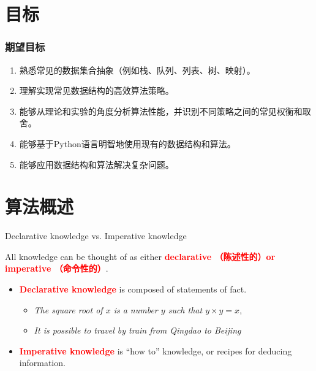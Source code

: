 \documentclass{sintefbeamer}
\begin{document}
\section{目标}

\begin{frame}
  \frametitle{期望目标}

  \begin{enumerate}
    \item 熟悉常见的数据集合抽象（例如栈、队列、列表、树、映射）。
    \item 理解实现常见数据结构的高效算法策略。
    \item 能够从理论和实验的角度分析算法性能，并识别不同策略之间的常见权衡和取舍。
    \item 能够基于Python语言明智地使用现有的数据结构和算法。
    \item 能够应用数据结构和算法解决复杂问题。
  \end{enumerate}

\end{frame}

\section{算法概述}

\begin{frame}{Declarative knowledge vs. Imperative knowledge}

  All knowledge can be thought of as either \textcolor{red}{\textbf{declarative （陈述性的）or imperative （命令性的）}}.

  \begin{itemize}[<+->]
    \item \textcolor{red}{\textbf{Declarative knowledge}} is composed of statements of fact.
          \begin{itemize}
            \item \textit{The square root of $x$ is a number $y$ such that $y \times y = x$},
            \item \textit{It is possible to travel by train from Qingdao to Beijing}
          \end{itemize}
    \item \textcolor{red}{\textbf{Imperative knowledge}} is ``how to'' knowledge, or recipes for deducing information.
  \end{itemize}

\end{frame}
\end{document}
